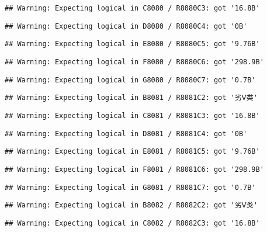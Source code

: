 \documentclass[
]{article}
\begin{document}
\begin{verbatim}
## Warning: Expecting logical in C8080 / R8080C3: got '16.8B'
\end{verbatim}

\begin{verbatim}
## Warning: Expecting logical in D8080 / R8080C4: got '0B'
\end{verbatim}

\begin{verbatim}
## Warning: Expecting logical in E8080 / R8080C5: got '9.76B'
\end{verbatim}

\begin{verbatim}
## Warning: Expecting logical in F8080 / R8080C6: got '298.9B'
\end{verbatim}

\begin{verbatim}
## Warning: Expecting logical in G8080 / R8080C7: got '0.7B'
\end{verbatim}

\begin{verbatim}
## Warning: Expecting logical in B8081 / R8081C2: got '劣Ⅴ类'
\end{verbatim}

\begin{verbatim}
## Warning: Expecting logical in C8081 / R8081C3: got '16.8B'
\end{verbatim}

\begin{verbatim}
## Warning: Expecting logical in D8081 / R8081C4: got '0B'
\end{verbatim}

\begin{verbatim}
## Warning: Expecting logical in E8081 / R8081C5: got '9.76B'
\end{verbatim}

\begin{verbatim}
## Warning: Expecting logical in F8081 / R8081C6: got '298.9B'
\end{verbatim}

\begin{verbatim}
## Warning: Expecting logical in G8081 / R8081C7: got '0.7B'
\end{verbatim}

\begin{verbatim}
## Warning: Expecting logical in B8082 / R8082C2: got '劣Ⅴ类'
\end{verbatim}

\begin{verbatim}
## Warning: Expecting logical in C8082 / R8082C3: got '16.8B'
\end{verbatim}
\end{document}
